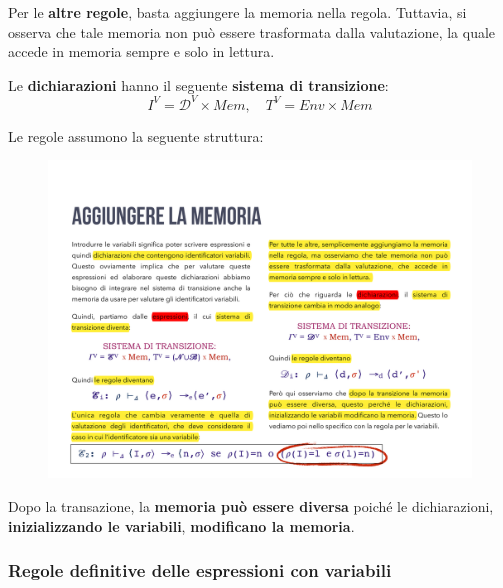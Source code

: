 \documentclass[a4paper]{article}
\begin{document}
 	\noindent
 	Per le \textbf{altre regole}, basta aggiungere la memoria nella regola. Tuttavia, si osserva che tale memoria non può essere trasformata dalla valutazione, la quale accede in memoria sempre e solo in lettura.\newline
 	
 	\noindent
 	\begin{boxdef}
 		Le \textcolor{Red3}{\textbf{dichiarazioni}} hanno il seguente \textbf{sistema di transizione}:
 		\begin{equation*}
 			I^{V} = \mathcal{D}^{V} \times Mem, \hspace{1em} T^{V} = Env \times Mem
 		\end{equation*}
 	\end{boxdef}
 	
 	\noindent
 	Le regole assumono la seguente struttura:
 	
 	\begin{figure}[!htp]
 		\centering
 		\includegraphics[width=.5\textwidth]{img/regola_dichiarazione-update-1.pdf}
 	\end{figure}
 	
 	\noindent
 	Dopo la transazione, la \textbf{memoria può essere diversa} poiché le dichiarazioni, \textbf{inizializzando le variabili}, \textbf{modificano la memoria}.\newpage
 	
 	\subsubsection{Regole definitive delle espressioni con variabili}
 	
\end{document}
